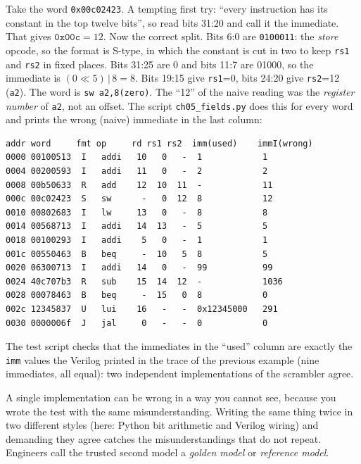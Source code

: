 \begin{example}\label{ex:fields05}
Take the word \texttt{0x00c02423}. A tempting first try: ``every
instruction has its constant in the top twelve bits'', so read bits
31:20 and call it the immediate. That gives
$\texttt{0x00c}=12$. Now the correct split. Bits 6:0 are
\texttt{0100011}: the \emph{store} opcode, so the format is S-type, in
which the constant is cut in two to keep \texttt{rs1} and \texttt{rs2}
in fixed places. Bits 31:25 are 0 and bits 11:7 are 01000, so the
immediate is $(0\ll5)\,|\,8=8$. Bits 19:15 give \texttt{rs1}=0, bits
24:20 give \texttt{rs2}=12 (\texttt{a2}). The word is
\texttt{sw a2,8(zero)}. The ``12'' of the naive reading was the
\emph{register number} of \texttt{a2}, not an offset. The script
\texttt{ch05\_fields.py} does this for every word and prints the wrong
(naive) immediate in the last column:
\begin{lstlisting}
addr word     fmt op     rd rs1 rs2  imm(used)    immI(wrong)
0000 00100513  I   addi   10   0   -  1            1
0004 00200593  I   addi   11   0   -  2            2
0008 00b50633  R   add    12  10  11  -            11
000c 00c02423  S   sw      -   0  12  8            12
0010 00802683  I   lw     13   0   -  8            8
0014 00568713  I   addi   14  13   -  5            5
0018 00100293  I   addi    5   0   -  1            1
001c 00550463  B   beq     -  10   5  8            5
0020 06300713  I   addi   14   0   -  99           99
0024 40c707b3  R   sub    15  14  12  -            1036
0028 00078463  B   beq     -  15   0  8            0
002c 12345837  U   lui    16   -   -  0x12345000   291
0030 0000006f  J   jal     0   -   -  0            0
\end{lstlisting}
The test script checks that the immediates in the ``used'' column are
exactly the \texttt{imm} values the Verilog printed in the trace of
the previous example (nine immediates, all equal): two independent
implementations of the scrambler agree.
\end{example}

\begin{principle}
A single implementation can be wrong in a way you cannot see, because
you wrote the test with the same misunderstanding. Writing the same
thing twice in two different styles (here: Python bit arithmetic and
Verilog wiring) and demanding they agree catches the misunderstandings
that do not repeat. Engineers call the trusted second model a
\emph{golden model} or \emph{reference model}.
\end{principle}

